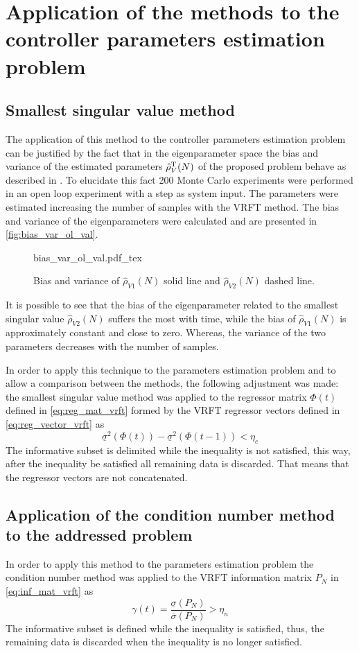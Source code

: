
\section{\label{sec:application} Application of the methods to the controller parameters estimation problem}

\subsection{Smallest singular value method}
The application of this method to the controller parameters estimation problem can be justified by the fact that in the eigenparameter space the bias and variance of the estimated parameters $\hat{\rho}_{V}^\text{T}(N)$ of the proposed problem behave as described in \cite{carrette1996discarding}.
To elucidate this fact 200 Monte Carlo experiments were performed in an open loop experiment with a step as system input.
The parameters were estimated increasing the number of samples with the VRFT method.
The bias and variance of the eigenparameters were calculated and are presented in \autoref{fig:bias_var_ol_val}.
\begin{figure}[h!]
  \centering
  \def\svgwidth{\columnwidth}
  {\footnotesize{bias_var_ol_val.pdf_tex}}
  \caption{\label{fig:bias_var_ol_val} Bias and variance of $\hat{\rho}_{V1}(N)$ solid line and $\hat{\rho}_{V2}(N)$ dashed line.}
\end{figure}

It is possible to see that the bias of the eigenparameter related to the smallest singular value $\hat{\rho}_{V2}(N)$ suffers the most with time, while the bias of $\hat{\rho}_{V1}(N)$ is approximately constant and close to zero.
Whereas, the variance of the two parameters decreases with the number of samples.


In order to apply this technique to the parameters estimation problem and to allow a comparison between the methods, the following adjustment was made:
the smallest singular value method was applied to the regressor matrix $\Phi(t)$ defined in \eqref{eq:reg_mat_vrft} formed by the VRFT regressor vectors defined in \eqref{eq:reg_vector_vrft} as
\[
  \underline{\sigma}^2(\Phi(t)) - \underline{\sigma}^2(\Phi(t-1)) < \eta_c
\]
The informative subset is delimited while the inequality is not satisfied, this way, after the inequality be satisfied all remaining data is discarded.
That means that the regressor vectors are not concatenated.

\subsection{Application of the condition number method to the addressed problem}
In order to apply this method to the parameters estimation problem the condition number method was applied to the VRFT information matrix $P_N$ in \eqref{eq:inf_mat_vrft} as
\[
  \gamma(t) = \frac{\underline{\sigma}(P_N)}{\overline{\sigma}(P_N)} > \eta_n
\]
The informative subset is defined while the inequality is satisfied, thus, the remaining data is discarded when the inequality is no longer satisfied.

